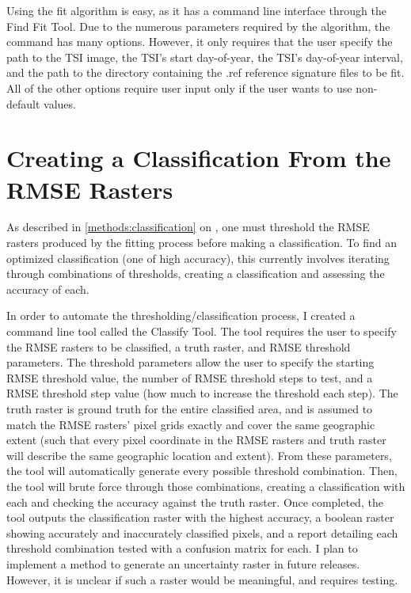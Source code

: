 Using the fit algorithm is easy, as it has a command line interface through the Find Fit Tool. Due to the numerous parameters required by the algorithm, the command has many options. However, it only requires that the user specify the path to the TSI image, the TSI's start day-of-year, the TSI's day-of-year interval, and the path to the directory containing the .ref reference signature files to be fit. All of the other options require user input only if the user wants to use non-default values.


\section{Creating a Classification From the RMSE Rasters}
\label{appendix:tools:classify}

As described in \autoref{methods:classification} on , one must threshold the RMSE rasters produced by the fitting process before making a classification. To find an optimized classification (one of high accuracy), this currently involves iterating through combinations of thresholds, creating a classification and assessing the accuracy of each.

In order to automate the thresholding/classification process, I created a command line tool called the Classify Tool. The tool requires the user to specify the RMSE rasters to be classified, a truth raster, and RMSE threshold parameters. The threshold parameters allow the user to specify the starting RMSE threshold value, the number of RMSE threshold steps to test, and a RMSE threshold step value (how much to increase the threshold each step). The truth raster is ground truth for the entire classified area, and is assumed to match the RMSE rasters’ pixel grids exactly and cover the same geographic extent (such that every pixel coordinate in the RMSE rasters and truth raster will describe the same geographic location and extent). From these parameters, the tool will automatically generate every possible threshold combination. Then, the tool will brute force through those combinations, creating a classification with each and checking the accuracy against the truth raster. Once completed, the tool outputs the classification raster with the highest accuracy, a boolean raster showing accurately and inaccurately classified pixels, and a report detailing each threshold combination tested with a confusion matrix for each. I plan to implement a method to generate an uncertainty raster \autocite[see][pages 190-191]{eastman2012idrisi} in future releases. However, it is unclear if such a raster would be meaningful, and requires testing.